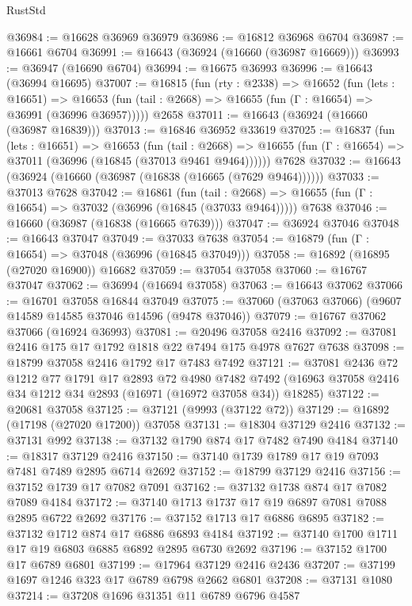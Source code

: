 \begin{lexlean}{RustStd}
\begin{coremodule}
@36984 := @16628 @36969 @36979
@36986 := @16812 @36968 @6704
@36987 := @16661 @6704
@36991 := @16643 (@36924 (@16660 (@36987 @16669)))
@36993 := @36947 (@16690 @6704)
@36994 := @16675 @36993
@36996 := @16643 (@36994 @16695)
@37007 := @16815
    (fun (rty : @2338) =>
    @16652
      (fun (lets : @16651) =>
      @16653 (fun (tail : @2668) => @16655 (fun (Γ : @16654) => @36991 (@36996 @36957)))))
    @2658
@37011 := @16643 (@36924 (@16660 (@36987 @16839)))
@37013 := @16846 @36952 @33619
@37025 := @16837
    (fun (lets : @16651) =>
    @16653
      (fun (tail : @2668) =>
      @16655 (fun (Γ : @16654) => @37011 (@36996 (@16845 (@37013 @9461 @9464))))))
    @7628
@37032 := @16643 (@36924 (@16660 (@36987 (@16838 (@16665 (@7629 @9464))))))
@37033 := @37013 @7628
@37042 := @16861
    (fun (tail : @2668) => @16655 (fun (Γ : @16654) => @37032 (@36996 (@16845 (@37033 @9464)))))
    @7638
@37046 := @16660 (@36987 (@16838 (@16665 @7639)))
@37047 := @36924 @37046
@37048 := @16643 @37047
@37049 := @37033 @7638
@37054 := @16879 (fun (Γ : @16654) => @37048 (@36996 (@16845 @37049)))
@37058 := @16892 (@16895 (@27020 @16900)) @16682
@37059 := @37054 @37058
@37060 := @16767 @37047
@37062 := @36994 (@16694 @37058)
@37063 := @16643 @37062
@37066 := @16701 @37058 @16844 @37049
@37075 := @37060 (@37063 @37066) (@9607 @14589 @14585 @37046 @14596 (@9478 @37046))
@37079 := @16767 @37062 @37066 (@16924 @36993)
@37081 := @20496 @37058 @2416
@37092 := @37081 @2416 @175 @17 @1792 @1818 @22 @7494 @175 @4978 @7627 @7638
@37098 := @18799 @37058 @2416 @1792 @17 @7483 @7492
@37121 := @37081
    @2436
    @72
    @1212
    @77
    @1791
    @17
    @2893
    @72
    @4980
    @7482
    @7492
    (@16963 @37058 @2416 @34 @1212 @34 @2893 (@16971 (@16972 @37058 @34)) @18285)
@37122 := @20681 @37058
@37125 := @37121 (@9993 (@37122 @72))
@37129 := @16892 (@17198 (@27020 @17200)) @37058
@37131 := @18304 @37129 @2416
@37132 := @37131 @992
@37138 := @37132 @1790 @874 @17 @7482 @7490 @4184
@37140 := @18317 @37129 @2416
@37150 := @37140 @1739 @1789 @17 @19 @7093 @7481 @7489 @2895 @6714 @2692
@37152 := @18799 @37129 @2416
@37156 := @37152 @1739 @17 @7082 @7091
@37162 := @37132 @1738 @874 @17 @7082 @7089 @4184
@37172 := @37140 @1713 @1737 @17 @19 @6897 @7081 @7088 @2895 @6722 @2692
@37176 := @37152 @1713 @17 @6886 @6895
@37182 := @37132 @1712 @874 @17 @6886 @6893 @4184
@37192 := @37140 @1700 @1711 @17 @19 @6803 @6885 @6892 @2895 @6730 @2692
@37196 := @37152 @1700 @17 @6789 @6801
@37199 := @17964 @37129 @2416 @2436
@37207 := @37199 @1697 @1246 @323 @17 @6789 @6798 @2662 @6801
@37208 := @37131 @1080
@37214 := @37208 @1696 @31351 @11 @6789 @6796 @4587

\end{coremodule}
\end{lexlean}
